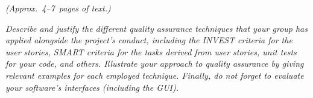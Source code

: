 \flushleft
\emph{(Approx.~4--7~pages of text.)}

\emph{Describe and justify the different quality assurance techniques that your group has applied alongside the project's conduct, including the INVEST criteria for the user stories, SMART criteria for the tasks derived from user stories, unit tests for your code, and others.  Illustrate your approach to quality assurance by giving relevant examples for each employed technique. Finally, do not forget to evaluate your software's interfaces (including the GUI).}

